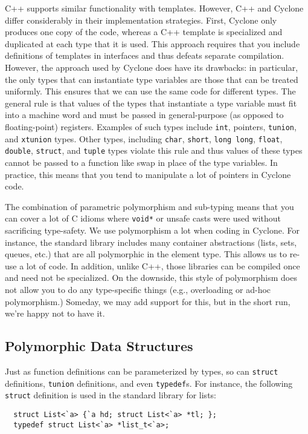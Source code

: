 C++ supports similar functionality with templates.  However, C++ and
Cyclone differ considerably in their implementation strategies.
First, Cyclone only produces one copy of the code, whereas a C++
template is specialized and duplicated at each type that it is used.
This approach requires that you include definitions of templates in
interfaces and thus defeats separate compilation.  However, the
approach used by Cyclone does have its drawbacks: in particular, the
only types that can instantiate type variables are those that can be
treated uniformly.  This ensures that we can use the same code for
different types.  The general rule is that values of the types that
instantiate a type variable must fit into a machine word and must be
passed in general-purpose (as opposed to floating-point) registers.
Examples of such types include \texttt{int}, pointers, \texttt{tunion},
and \texttt{xtunion} types.  Other types, including \texttt{char},
\texttt{short}, \texttt{long long}, \texttt{float}, \texttt{double},
\texttt{struct}, and \texttt{tuple} types violate this rule and thus
values of these types cannot be passed to a function like swap in
place of the type variables. In practice, this means that you tend to
manipulate a lot of pointers in Cyclone code.

The combination of parametric polymorphism and sub-typing means that
you can cover a lot of C idioms where \texttt{void*} or unsafe casts
were used without sacrificing type-safety.  We use polymorphism a lot
when coding in Cyclone.  For instance, the standard library includes
many container abstractions (lists, sets, queues, etc.) that are all
polymorphic in the element type.  This allows us to re-use a lot of
code.  In addition, unlike C++, those libraries can be compiled once
and need not be specialized.  On the downside, this style of
polymorphism does not allow you to do any type-specific things (e.g.,
overloading or ad-hoc polymorphism.)  Someday, we may add support for
this, but in the short run, we're happy not to have it.


\subsection{Polymorphic Data Structures}
Just as function definitions can be parameterized by types, so can
\texttt{struct} definitions, \texttt{tunion} definitions, and even
\texttt{typedef}s.  For instance, the following \texttt{struct} definition
is used in the standard library for lists:
\begin{verbatim}
  struct List<`a> {`a hd; struct List<`a> *tl; };
  typedef struct List<`a> *list_t<`a>;
\end{verbatim}

